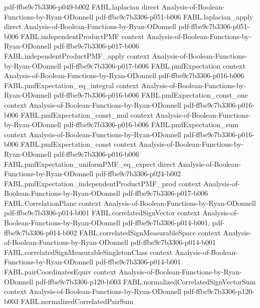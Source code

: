 \begin{theorem}
  {pdf-ffbe9c7b3306-p049-b002}
\proofstep
  {FABL.laplacian}
  {direct}
  {Analysis-of-Boolean-Functions-by-Ryan-ODonnell}
  {pdf-ffbe9c7b3306-p051-b006}
\proofstep
  {FABL.laplacian_apply}
  {direct}
  {Analysis-of-Boolean-Functions-by-Ryan-ODonnell}
  {pdf-ffbe9c7b3306-p051-b006}
\proofstep
  {FABL.independentProductPMF}
  {context}
  {Analysis-of-Boolean-Functions-by-Ryan-ODonnell}
  {pdf-ffbe9c7b3306-p017-b006}
\proofstep
  {FABL.independentProductPMF_apply}
  {context}
  {Analysis-of-Boolean-Functions-by-Ryan-ODonnell}
  {pdf-ffbe9c7b3306-p017-b006}
\proofstep
  {FABL.pmfExpectation}
  {context}
  {Analysis-of-Boolean-Functions-by-Ryan-ODonnell}
  {pdf-ffbe9c7b3306-p016-b006}
\proofstep
  {FABL.pmfExpectation_eq_integral}
  {context}
  {Analysis-of-Boolean-Functions-by-Ryan-ODonnell}
  {pdf-ffbe9c7b3306-p016-b006}
\proofstep
  {FABL.pmfExpectation_const_one}
  {context}
  {Analysis-of-Boolean-Functions-by-Ryan-ODonnell}
  {pdf-ffbe9c7b3306-p016-b006}
\proofstep
  {FABL.pmfExpectation_const_mul}
  {context}
  {Analysis-of-Boolean-Functions-by-Ryan-ODonnell}
  {pdf-ffbe9c7b3306-p016-b006}
\proofstep
  {FABL.pmfExpectation_sum}
  {context}
  {Analysis-of-Boolean-Functions-by-Ryan-ODonnell}
  {pdf-ffbe9c7b3306-p016-b006}
\proofstep
  {FABL.pmfExpectation_const}
  {context}
  {Analysis-of-Boolean-Functions-by-Ryan-ODonnell}
  {pdf-ffbe9c7b3306-p016-b006}
\proofstep
  {FABL.pmfExpectation_uniformPMF_eq_expect}
  {direct}
  {Analysis-of-Boolean-Functions-by-Ryan-ODonnell}
  {pdf-ffbe9c7b3306-p024-b002}
\proofstep
  {FABL.pmfExpectation_independentProductPMF_prod}
  {context}
  {Analysis-of-Boolean-Functions-by-Ryan-ODonnell}
  {pdf-ffbe9c7b3306-p017-b006}
\proofstep
  {FABL.CorrelationPlane}
  {context}
  {Analysis-of-Boolean-Functions-by-Ryan-ODonnell}
  {pdf-ffbe9c7b3306-p014-b001}
\proofstep
  {FABL.correlatedSignVector}
  {context}
  {Analysis-of-Boolean-Functions-by-Ryan-ODonnell}
  {pdf-ffbe9c7b3306-p014-b001,
    pdf-ffbe9c7b3306-p014-b002}
\proofstep
  {FABL.correlatedSignMeasurableSpace}
  {context}
  {Analysis-of-Boolean-Functions-by-Ryan-ODonnell}
  {pdf-ffbe9c7b3306-p014-b001}
\proofstep
  {FABL.correlatedSignMeasurableSingletonClass}
  {context}
  {Analysis-of-Boolean-Functions-by-Ryan-ODonnell}
  {pdf-ffbe9c7b3306-p014-b001}
\proofstep
  {FABL.pairCoordinatesEquiv}
  {context}
  {Analysis-of-Boolean-Functions-by-Ryan-ODonnell}
  {pdf-ffbe9c7b3306-p120-b003}
\proofstep
  {FABL.normalizedCorrelatedSignVectorSum}
  {context}
  {Analysis-of-Boolean-Functions-by-Ryan-ODonnell}
  {pdf-ffbe9c7b3306-p120-b003}
\proofstep
  {FABL.normalizedCorrelatedPairSum}

\end{theorem}
